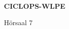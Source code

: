 \documentclass[a4paper]{article}
\begin{document}
\printGenericVSLHeader
\begin{center}
\begin{vsltext}{3cm}{4cm}

   \vspace{0.5cm} 

    \textbf{CICLOPS-WLPE} 

    \vspace{1.5cm}

    Hörsaal 7

\end{vsltext}

\end{center}
\end{document}
